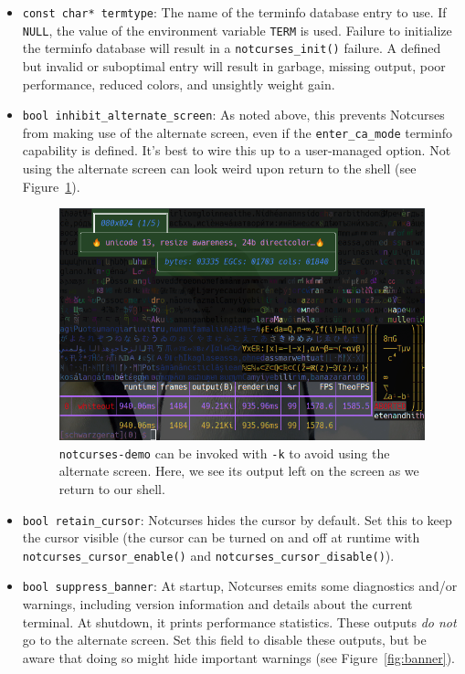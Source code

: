 \documentclass[letterpaper,10pt]{article}
\newenvironment{denseitemize}{
  \begin{itemize}
      \setlength{\itemsep}{0pt}
}{
  \end{itemize}
}
\begin{document}
\begin{denseitemize}
\item{\texttt{const char* termtype}: The name of the terminfo database entry to
    use. If \texttt{NULL}, the value of the environment variable \texttt{TERM}
    is used. Failure to initialize the terminfo database will result in a
    \texttt{notcurses\_init()} failure.} A defined but invalid or suboptimal
    entry will result in garbage, missing output, poor performance, reduced
    colors, and unsightly weight gain.
\item{\texttt{bool inhibit\_alternate\_screen}: As noted above, this prevents
    Notcurses from making use of the alternate screen, even if the \texttt{enter\_ca\_mode}
    terminfo capability is defined. It's best to wire this up to a user-managed
    option. Not using the alternate screen can look weird upon return to the
    shell (see Figure~\ref{fig:altscreen}).

\begin{figure}[!htbp]
\centering \includegraphics[width=.7\linewidth]{media/no-alternate-screen.png}
\caption{\texttt{notcurses-demo} can be invoked with \texttt{-k} to avoid
  using the alternate screen. Here, we see its output left on the screen as
  we return to our shell.}
\label{fig:altscreen}
\end{figure}
  }
\item{\texttt{bool retain\_cursor}: Notcurses hides the cursor by default.
    Set this to keep the cursor visible (the cursor can be turned on and off
    at runtime with \texttt{notcurses\_cursor\_enable()} and
    \texttt{notcurses\_cursor\_disable()}).}
\item{\texttt{bool suppress\_banner}: At startup, Notcurses emits some
    diagnostics and/or warnings, including version information and details
    about the current terminal. At shutdown, it prints performance statistics.
    These outputs \textit{do not} go to the alternate screen. Set this
    field to disable these outputs, but be aware that doing so might hide
    important warnings (see Figure~\ref{fig:banner}).

}
\end{denseitemize}
\end{document}
